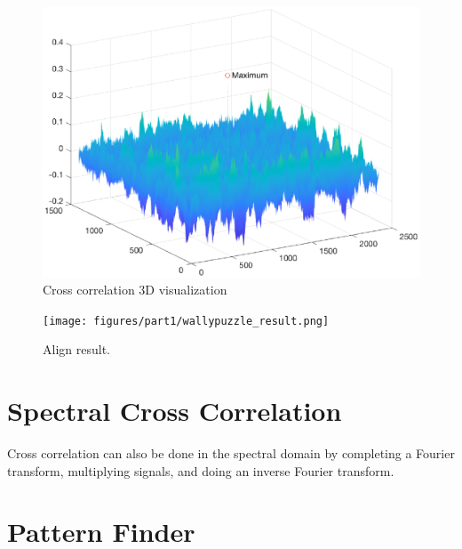 \begin{figure}[h!]
	\begin{center}
		\includegraphics[width=0.40\linewidth]{figures/part1/crr_vis2.eps}
	\end{center}
	\caption{Cross correlation 3D visualization}
	\label{fig:crr_vis2}
\end{figure} 

\begin{figure}[h!]
	\centering
	\texttt{[image: figures/part1/wallypuzzle\_result.png]}
\centering
\caption{Align result. }
\label{fig:maze-b}
\end{figure} 

\section{Spectral Cross Correlation}

Cross correlation can also be done in the spectral domain by completing a Fourier transform, multiplying signals, and doing an inverse Fourier transform.


\section{Pattern Finder}

